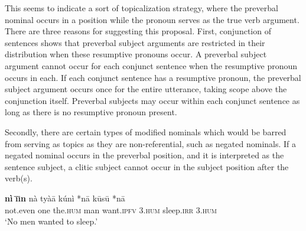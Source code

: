 \documentclass[output=paper,modfonts,nonflat]{langsci/langscibook}
\begin{document}
This seems to indicate a sort of topicalization strategy, where the preverbal nominal occurs in a  position while the pronoun serves as the true verb argument.  There are three reasons for suggesting this proposal.  First, conjunction of sentences shows that preverbal subject arguments are restricted in their distribution when these resumptive pronouns occur.  A preverbal subject argument cannot occur for each conjunct sentence when the resumptive pronoun occurs in each.  If each conjunct sentence has a resumptive pronoun, the preverbal subject argument occurs once for the entire utterance, taking scope above the conjunction itself.  Preverbal subjects may occur within each conjunct sentence as long as there is no resumptive pronoun present. 

\ea {}\label{ex:cisneros:23}
\z 
\z

Secondly, there are certain types of modified nominals which would be barred from serving as topics as they are non-referential, such as negated nominals.  If a negated nominal occurs in the preverbal position, and it is interpreted as the sentence subject, a clitic subject cannot occur in the subject position after the verb(s).

\ea {}\label{ex:cosneros:24}
\gll
{\ob}\textbf{n\`i} \textbf{\=\i\=\i n} n\`a ty\`a\=a{\cb} k\'un\`i {\op}\textnormal{*}n\=a{\cp} k\=us\=u {\op}\textnormal{*}n\=a{\cp}\\
{\db}not.even one the.\textsc{hum} man want.\textsc{ipfv} \phantom{(*}3.\textsc{hum} sleep.\textsc{irr} \phantom{(*}3.\textsc{hum}\\
\glt
`No men wanted to sleep.'
\z 
\end{document}
